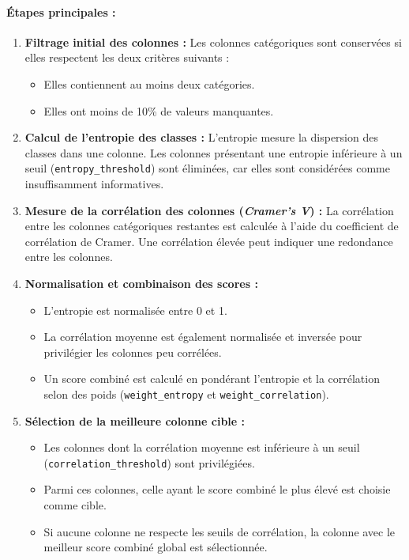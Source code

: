 \documentclass{rapport}
\begin{document}
\paragraph{Étapes principales :}
\begin{enumerate}
    \item \textbf{Filtrage initial des colonnes :} Les colonnes catégoriques sont conservées si elles respectent les deux critères suivants :
    \begin{itemize}
        \item Elles contiennent au moins deux catégories.
        \item Elles ont moins de 10\% de valeurs manquantes.
    \end{itemize}

    \item \textbf{Calcul de l’entropie des classes :} 
    L’entropie mesure la dispersion des classes dans une colonne. Les colonnes présentant une entropie inférieure à un seuil (\texttt{entropy\_threshold}) sont éliminées, car elles sont considérées comme insuffisamment informatives.

    \item \textbf{Mesure de la corrélation des colonnes (\textit{Cramer’s V}) :}
    La corrélation entre les colonnes catégoriques restantes est calculée à l’aide du coefficient de corrélation de Cramer. Une corrélation élevée peut indiquer une redondance entre les colonnes.

    \item \textbf{Normalisation et combinaison des scores :}
    \begin{itemize}
        \item L’entropie est normalisée entre 0 et 1.
        \item La corrélation moyenne est également normalisée et inversée pour privilégier les colonnes peu corrélées.
        \item Un score combiné est calculé en pondérant l’entropie et la corrélation selon des poids (\texttt{weight\_entropy} et \texttt{weight\_correlation}).
    \end{itemize}

    \item \textbf{Sélection de la meilleure colonne cible :}
    \begin{itemize}
        \item Les colonnes dont la corrélation moyenne est inférieure à un seuil (\texttt{correlation\_threshold}) sont privilégiées.
        \item Parmi ces colonnes, celle ayant le score combiné le plus élevé est choisie comme cible.
        \item Si aucune colonne ne respecte les seuils de corrélation, la colonne avec le meilleur score combiné global est sélectionnée.
    \end{itemize}
\end{enumerate}
\end{document}
